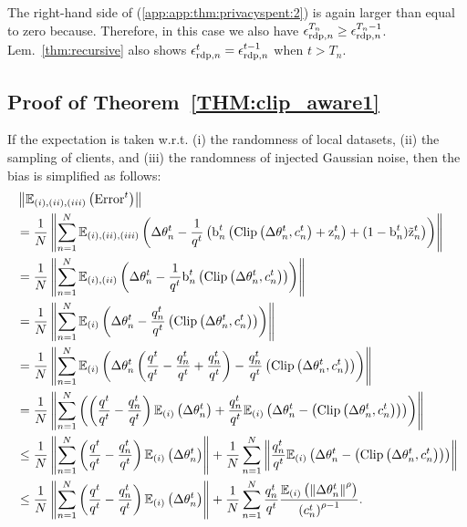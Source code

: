 The right-hand side of (\ref{app:app:thm:privacyspent:2}) is again larger than equal to zero because. Therefore, in this case we also have ${\epsilon}_{\text{rdp}, n}^{T_n} \geq {\epsilon}_{\text{rdp}, n}^{T_n-1}$.  Lem.~\ref{thm:recursive} also shows ${\epsilon}_{\text{rdp}, n}^{t} = {\epsilon}_{\text{rdp}, n}^{t-1}$ when $t>T_n$.


\subsection{Proof of Theorem~\ref{THM:clip_aware1}}\label{app:THM:clip_aware1}


If the expectation is taken w.r.t. (i) the randomness of local datasets, (ii) the sampling of clients, and (iii) the randomness of injected Gaussian noise, then the bias
is simplified as follows:
\begin{align}
&\left\| \mathbb{E}_{(i),(ii),(iii)}\left({\text{Error}^t}\right)\right\| \nonumber 
\\
&= \frac{1}{N} \left\| \sum_{n=1}^N \mathbb{E}_{(i),(ii),(iii)}\left({\Delta {\theta}_n^t -  \frac{1}{q^t}\left({\textnormal{b}}_n^t \left(\text{Clip}\left({\Delta {\theta}_n^t}, c_n^t\right)+{\textnormal{z}}_n^t\right)+ (1-{\textnormal{b}}_n^t)\tilde{{\textnormal{z}}}_n^t\right)}\right) \right\|
\nonumber
\\
&= \frac{1}{N} \left\| \sum_{n=1}^N \mathbb{E}_{(i),(ii)}\left({\Delta {\theta}_n^t -  \frac{1}{q^t}{\textnormal{b}}_n^t \left(\text{Clip}\left({\Delta {\theta}_n^t}, c_n^t\right)\right)}\right) \right\|
\label{app:THM:clip_aware1:2}
\\
& = \frac{1}{N} \left\| \sum_{n=1}^N \mathbb{E}_{(i)}\left({{\Delta {\theta}_n^t} -  \frac{q_n^t}{q^t} \left(\text{Clip}\left({\Delta {\theta}_n^t}, c_n^t\right)\right)}\right) \right\|
\label{app:THM:clip_aware1:4}
\\
& = \frac{1}{N} \left\| \sum_{n=1}^N \mathbb{E}_{(i)}\left({{\Delta {\theta}_n^t}\left(\frac{q^t}{q^t} - \frac{q_n^t}{q^t} + \frac{q_n^t}{q^t}\right) -  \frac{q_n^t}{q^t} \left(\text{Clip}\left({\Delta {\theta}_n^t}, c_n^t\right)\right)}\right) \right\|
\label{app:THM:clip_aware1:5}
\\
& = \frac{1}{N} \left\| \sum_{n=1}^N \left(\left(\frac{q^t}{q^t} - \frac{q_n^t}{q^t}\right)\mathbb{E}_{(i)}\left({{\Delta {\theta}_n^t}}\right) + \frac{q_n^t}{q^t} \mathbb{E}_{(i)}\left({{\Delta {\theta}_n^t}-   \left(\text{Clip}\left({\Delta {\theta}_n^t}, c_n^t\right)\right)}\right)\right) \right\|
\label{app:THM:clip_aware1:6}
\\
&\leq \frac{1}{N} \left\| \sum_{n=1}^N \left(\frac{q^t}{q^t} - \frac{q_n^t}{q^t}\right)\mathbb{E}_{(i)}\left({{\Delta {\theta}_n^t}}\right)\right\| + \frac{1}{N}\sum_{n=1}^N\left\|\frac{q_n^t}{q^t} \mathbb{E}_{(i)}\left({{\Delta {\theta}_n^t}-   \left(\text{Clip}\left({\Delta {\theta}_n^t}, c_n^t\right)\right)}\right) \right\|
\label{app:THM:clip_aware1:7}
\\
&\leq \frac{1}{N} \left\| \sum_{n=1}^N \left(\frac{q^t}{q^t} - \frac{q_n^t}{q^t}\right)\mathbb{E}_{(i)}\left({{\Delta {\theta}_n^t}}\right)\right\| + \frac{1}{N}\sum_{n=1}^N \frac{q_n^t}{q^t}  \frac{\mathbb{E}_{(i)}\left({\left\|{\Delta {\theta}_n^t}\right\|^{\rho}}\right)}{\left(c_n^t\right)^{\rho-1}}. \label{app:THM:clip_aware1:8}
\end{align}
